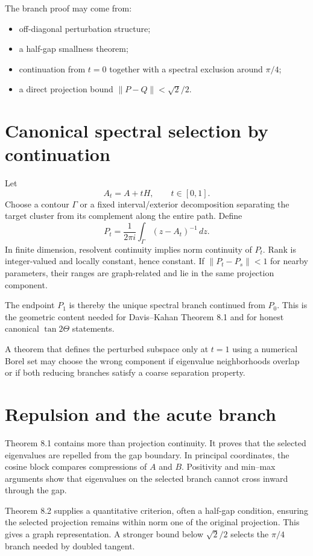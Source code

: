 The branch proof may come from:
\begin{itemize}
\item off-diagonal perturbation structure;
\item a half-gap smallness theorem;
\item continuation from $t=0$ together with a spectral exclusion around $\pi/4$;
\item a direct projection bound $\|P-Q\|<\sqrt2/2$.
\end{itemize}

\section{Canonical spectral selection by continuation}

Let
\[
  A_t=A+tH,
  \qquad t\in[0,1].
\]
Choose a contour $\Gamma$ or a fixed interval/exterior decomposition separating the target cluster from its complement along the entire path. Define
\[
  P_t=\frac{1}{2\pi i}\int_\Gamma(z-A_t)^{-1}\,dz.
\]
In finite dimension, resolvent continuity implies norm continuity of $P_t$. Rank is integer-valued and locally constant, hence constant. If $\|P_t-P_s\|<1$ for nearby parameters, their ranges are graph-related and lie in the same projection component.

The endpoint $P_1$ is thereby the unique spectral branch continued from $P_0$. This is the geometric content needed for Davis--Kahan Theorem 8.1 and for honest canonical $\tan 2\Theta$ statements.

A theorem that defines the perturbed subspace only at $t=1$ using a numerical Borel set may choose the wrong component if eigenvalue neighborhoods overlap or if both reducing branches satisfy a coarse separation property.

\section{Repulsion and the acute branch}

Theorem 8.1 contains more than projection continuity. It proves that the selected eigenvalues are repelled from the gap boundary. In principal coordinates, the cosine block compares compressions of $A$ and $B$. Positivity and min--max arguments show that eigenvalues on the selected branch cannot cross inward through the gap.

Theorem 8.2 supplies a quantitative criterion, often a half-gap condition, ensuring the selected projection remains within norm one of the original projection. This gives a graph representation. A stronger bound below $\sqrt2/2$ selects the $\pi/4$ branch needed by doubled tangent.

